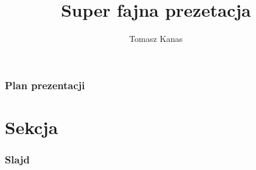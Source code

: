 \documentclass{beamer}
\title{Super fajna prezetacja}
\author{Tomasz Kanas}
\begin{document}
\maketitle

\begin{frame}
  \frametitle{Plan prezentacji}
  \tableofcontents
\end{frame}

\section[Krótka sekcja]{Sekcja}

\begin{frame}
  \frametitle{Slajd}
\end{frame}

\begin{frame}
\end{frame}
\end{document}
